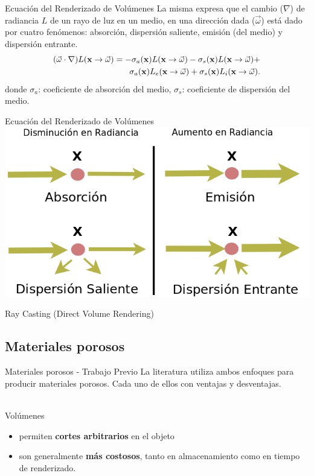 \documentclass[spanish]{beamer}
\begin{document}
\begin{frame}{Ecuación del Renderizado de Volúmenes}
La misma expresa que el cambio ($\nabla$) de radiancia $L$ de un rayo de luz en un medio, en una dirección dada ($\vec{\omega}$) está dado por cuatro fenómenos: absorción, dispersión saliente, emisión (del medio) y dispersión entrante.
\begin{equation*}
\begin{aligned}
(\vec{\omega} \cdot \nabla) L(\bold{x} \rightarrow \vec{\omega}) = - \sigma_{a}(\bold{x}) L(\bold{x} \rightarrow \vec{\omega}) - \sigma_{s}(\bold{x}) L(\bold{x} \rightarrow \vec{\omega}) + \\
\sigma_{a}(\bold{x}) L_{e}(\bold{x} \rightarrow \vec{\omega}) + \sigma_{s}(\bold{x}) L_{i}(\bold{x} \rightarrow \vec{\omega}).
\end{aligned}
\end{equation*}
donde $\sigma_{a}$: coeficiente de absorción del medio, $\sigma_{s}$: coeficiente de dispersión del medio.

\end{frame}

\begin{frame}{Ecuación del Renderizado de Volúmenes}
\includegraphics[scale = 0.55]{../figures/fenomenosrte}

Ray Casting (Direct Volume Rendering)
\end{frame}



\subsection{Materiales porosos}


\begin{frame}{Materiales porosos - Trabajo Previo}
La literatura utiliza ambos enfoques para producir materiales porosos. Cada uno de ellos con ventajas y desventajas.

\ \\

Volúmenes
\begin{block}{}
\begin{itemize}
\item permiten \textbf{cortes arbitrarios} en el objeto
\item son generalmente \textbf{más costosos}, tanto en almacenamiento como en tiempo de renderizado.
\end{itemize}
\end{block}
\end{frame}
\end{document}
